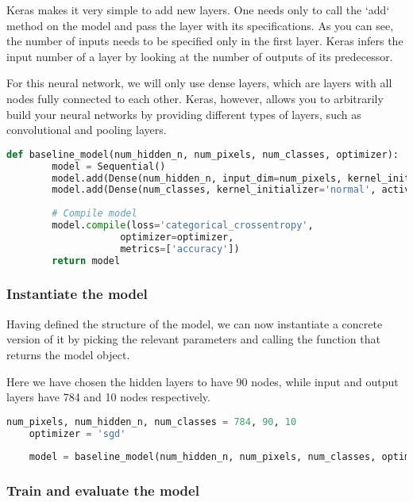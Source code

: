 Keras makes it very simple to add new layers. One needs only to call the `add` method on the model and pass the layer with its specifications. As you can see, the number of inputs needs to be specified only in the first layer. Keras infers the input number of a layer by looking at the number of outputs of its predecessor.

For this neural network, we will only use dense layers, which are layers with all nodes fully connected to each other. Keras, however, allows you to arbitrarily build your neural networks by providing different types of layers, such as convolutional and pooling layers.

\begin{lstlisting}[language=Python]
    def baseline_model(num_hidden_n, num_pixels, num_classes, optimizer):
        model = Sequential()
        model.add(Dense(num_hidden_n, input_dim=num_pixels, kernel_initializer='normal', activation='relu'))
        model.add(Dense(num_classes, kernel_initializer='normal', activation='softmax'))
        
        # Compile model
        model.compile(loss='categorical_crossentropy', 
                    optimizer=optimizer,
                    metrics=['accuracy'])
        return model
\end{lstlisting}

\subsubsection{Instantiate the model}

Having defined the structure of the model, we can now instantiate a concrete version of it by picking the relevant parameters and calling the function that returns the model object.

Here we have chosen the hidden layers to have 90 nodes, while input and output layers have 784 and 10 nodes respectively. 

\begin{lstlisting}[language=Python]
    num_pixels, num_hidden_n, num_classes = 784, 90, 10
    optimizer = 'sgd'
    
    model = baseline_model(num_hidden_n, num_pixels, num_classes, optimizer)
\end{lstlisting}

\subsubsection{Train and evaluate the model}

